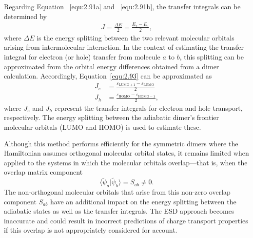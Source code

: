 Regarding Equation ~\eqref{equ:2.91a} and ~\eqref{equ:2.91b}, the transfer integrals can be determined by
\begin{equation} \label{equ:2.93}
\begin{split}
J = \frac{\Delta E}{2} = \frac{E_{2} -  E_{1}}{2},
\end{split}
\end{equation}
where \(\Delta E\) is the energy splitting between the two relevant molecular orbitals arising from intermolecular interaction.
In the context of estimating the transfer integral for electron (or hole) transfer from molecule $a$ to $b$, this splitting can be approximated from the orbital energy differences obtained from a dimer calculation. 
Accordingly, Equation~\eqref{equ:2.93} can be approximated as
\begin{subequations}
\begin{align} 
   \label{equ:2.94a} J_{e} &= \frac{\varepsilon_{\text{LUMO}+1} -  \varepsilon_{\text{LUMO}}}{2}\\
   \label{equ:2.94b} J_{h} &= \frac{\varepsilon_{\text{HOMO}} -  \varepsilon_{\text{HOMO}-1}}{2},  
\end{align}
\end{subequations}
where $J_{e}$ and $J_{h}$ represent the transfer integrals for electron and hole transport, respectively. 
The energy splitting between the adiabatic dimer's frontier molecular orbitals (LUMO and HOMO) is used to estimate these.

Although this method performs efficiently for the symmetric dimers where the Hamiltonian assumes orthogonal molecular orbital states, it remains limited when applied to the systems in which the molecular orbitals overlap—that is, when the overlap matrix component \[\langle \tilde{\psi}_a | \tilde{\psi}_b \rangle = S_{ab} \neq 0.\]
The non-orthogonal molecular orbitals that arise from this non-zero overlap component $S_{ab}$ have an additional impact on the energy splitting between the adiabatic states as well as the transfer integrals. 
The ESD approach becomes inaccurate and could result in incorrect predictions of charge transport properties if this overlap is not appropriately considered for account.

